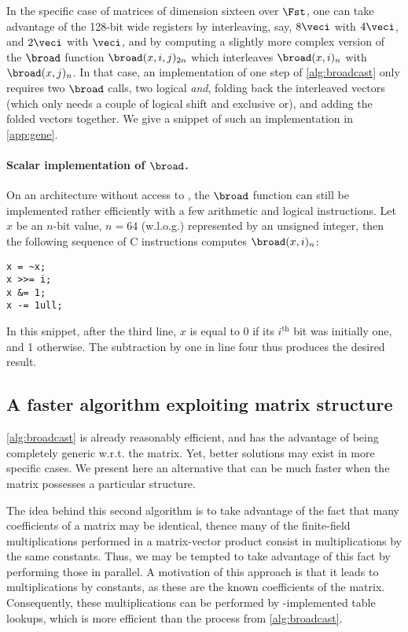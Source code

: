\medskip

In the specific case of matrices of dimension sixteen over $\Fst$, one can take advantage of the 128-bit
wide \xmm{} registers by interleaving, say, $8\veci$ with $4\veci$, and $2\veci$ with $\veci$, and by computing a slightly more
complex version of the $\broad$ function $\broad(x,i,j)_{2n}$ which interleaves $\broad(x,i)_n$ with $\broad(x,j)_n$.
In that case, an implementation of one step of \autoref{alg:broadcast} only requires two $\broad$ calls, two logical \emph{and}, folding back the interleaved vectors
(which only needs a couple of logical shift and exclusive or), and adding the folded vectors together.
We give a snippet of such an implementation in \autoref{app:gene}.

\paragraph{Scalar implementation of $\broad$.}
On an architecture without access to \pshufb, the $\broad$ function can still be implemented rather efficiently with a few arithmetic and logical instructions.
Let $x$ be an $n$-bit value, $n = 64$ (w.l.o.g.) represented by an unsigned integer, then the following sequence of C instructions computes $\broad(x,i)_n$:
\begin{center}
\begin{verbatim}
x = ~x;
x >>= i;
x &= 1;
x -= 1ull;
\end{verbatim}
\end{center}
In this snippet, after the third line, $x$ is equal to 0 if its $i^\text{th}$ bit was initially one, and 1 otherwise. The subtraction by one in line four thus produces the desired result.

\subsection{A faster algorithm exploiting matrix structure}
\label{shuff}

\autoref{alg:broadcast} is already reasonably efficient, and has the
advantage of being completely generic w.r.t. the matrix. Yet, better solutions may exist in more specific cases.
We present here an alternative that can be much faster when the matrix possesses a particular structure.

The idea behind this second algorithm is to take advantage of the fact that many coefficients of a matrix may be identical, thence many of the finite-field multiplications performed in
a matrix-vector product consist in multiplications by the same constants. Thus, we may be tempted
to take advantage of this fact by performing those in parallel.
A motivation of this approach is that it leads to multiplications by constants, as these are the known coefficients of the matrix.
Consequently, these multiplications can be performed by \pshufb-implemented table lookups, which is more efficient than
the process from \autoref{alg:broadcast}.

